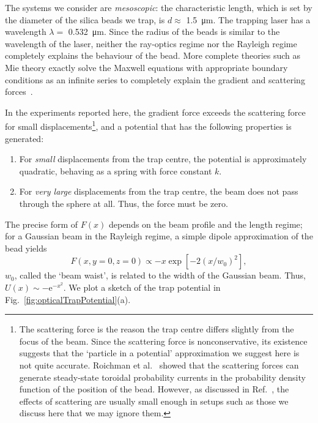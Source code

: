 \documentclass[hyperref={colorlinks=true, urlcolor=blue, citecolor=blue, final, bound}]{sfuthesis}
\newcommand{\e}{\mathrm{e}}
\begin{document}
The systems we consider are \textit{mesoscopic}: the characteristic length, which is set by the diameter of the silica beads we trap, is $d \approx$ \qty{1.5}{\micro\metre}. The trapping laser has a wavelength $\lambda = $ \qty{0.532}{\micro\metre}. Since the radius of the beads is similar to the wavelength of the laser, neither the ray-optics regime nor the Rayleigh regime completely explains the behaviour of the bead. More complete theories such as Mie theory exactly solve the Maxwell equations with appropriate boundary conditions as an infinite series to completely explain the gradient and scattering forces~\cite[Ch.~5]{Jones2015}. 

In the experiments reported here, the gradient force exceeds the scattering force for small displacements\footnote{The scattering force is the reason the trap centre differs slightly from the focus of the beam. Since the scattering force is nonconservative, its existence suggests that the `particle in a potential' approximation we suggest here is not quite accurate. Roichman et al.~\cite{Roichman2008} showed that the scattering forces can generate steady-state toroidal probability currents in the probability density function of the position of the bead. However, as discussed in Ref.~\cite{Roichman2008}, the effects of scattering are usually small enough in setups such as those we discuss here that we may ignore them. }, and a potential that has the following properties is generated:
\begin{enumerate}
    \item For \textit{small} displacements from the trap centre, the potential is approximately quadratic, behaving as a spring with force constant $k$.
    \item For \textit{very large} displacements from the trap centre, the beam does not pass through the sphere at all. Thus, the force must be zero.
\end{enumerate}
The precise form of $F(x)$ depends on the beam profile and the length regime; for a Gaussian beam in the Rayleigh regime, a simple dipole approximation of the bead yields~\cite{Harada1996}
\begin{equation}
    F(x, y=0, z=0)\propto -x\exp[-2(x/w_0)^2], 
\end{equation} 
$w_0$, called the `beam waist', is related to the width of the Gaussian beam. Thus, $U(x)\sim -\e^{-x^2}$. We plot a sketch of the trap potential in Fig.~\ref{fig:opticalTrapPotential}(a).
\end{document}
